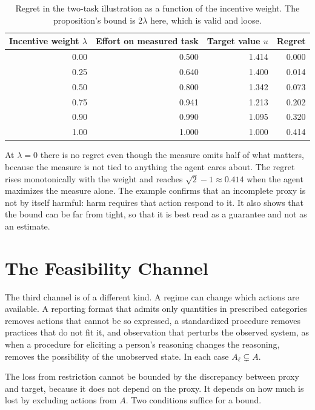 \documentclass[11pt]{article}
\theoremstyle{remark}
\begin{document}
\begin{table}[ht]
\centering
\small
\begin{tabular}{rrrr}
\toprule
Incentive weight $\lambda$ & Effort on measured task & Target value $u$ & Regret \\
\midrule
0.00 & 0.500 & 1.414 & 0.000 \\
0.25 & 0.640 & 1.400 & 0.014 \\
0.50 & 0.800 & 1.342 & 0.073 \\
0.75 & 0.941 & 1.213 & 0.202 \\
0.90 & 0.990 & 1.095 & 0.320 \\
1.00 & 1.000 & 1.000 & 0.414 \\
\bottomrule
\end{tabular}
\caption{Regret in the two-task illustration as a function of the incentive weight. The proposition's bound is $2\lambda$ here, which is valid and loose.}
\end{table}

At $\lambda=0$ there is no regret even though the measure omits half of what matters, because the measure is not tied to anything the agent cares about. The regret rises monotonically with the weight and reaches $\sqrt2-1\approx0.414$ when the agent maximizes the measure alone. The example confirms that an incomplete proxy is not by itself harmful: harm requires that action respond to it. It also shows that the bound can be far from tight, so that it is best read as a guarantee and not as an estimate.

\section{The Feasibility Channel}

The third channel is of a different kind. A regime can change which actions are available. A reporting format that admits only quantities in prescribed categories removes actions that cannot be so expressed, a standardized procedure removes practices that do not fit it, and observation that perturbs the observed system, as when a procedure for eliciting a person's reasoning changes the reasoning, removes the possibility of the unobserved state. In each case $A_\ell\subsetneq A$.

The loss from restriction cannot be bounded by the discrepancy between proxy and target, because it does not depend on the proxy. It depends on how much is lost by excluding actions from $A$. Two conditions suffice for a bound.
\end{document}

